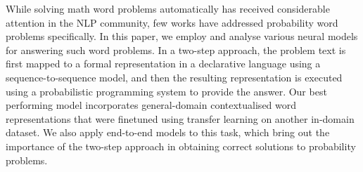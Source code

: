 While solving math word problems automatically has received considerable attention in the NLP community, few works have addressed probability word problems specifically. In this paper, we employ and analyse various neural models for answering such word problems. In a two-step approach, the problem text is first mapped to a formal representation in a declarative language using a sequence-to-sequence model, and then the resulting representation is executed using a probabilistic programming system to provide the answer. Our best performing model incorporates general-domain contextualised word representations that were finetuned using transfer learning on another in-domain dataset. We also apply end-to-end models to this task, which bring out the importance of the two-step approach in obtaining correct solutions to probability problems.
